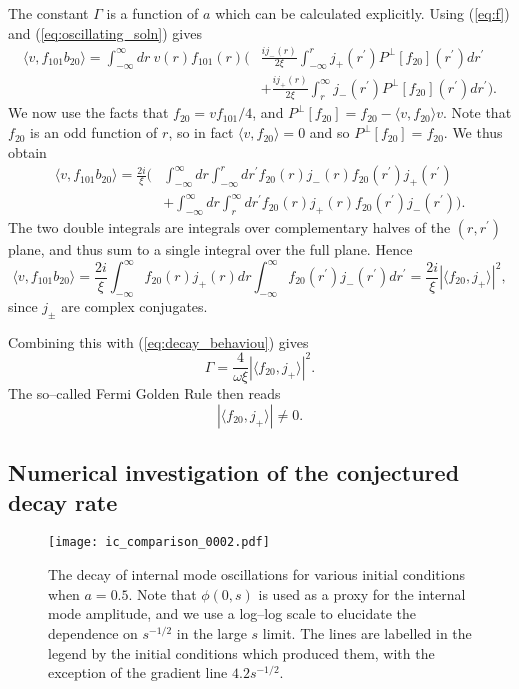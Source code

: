 The constant $\Gamma$ is a function of $a$ which can be calculated explicitly. Using (\ref{eq:f}) and (\ref{eq:oscillating_soln}) gives
\begin{align*}
\langle v, f_{101}b_{20}\rangle = \int_{-\infty}^{\infty}dr\ v(r)f_{101}(r)\bigg(&\frac{ij_-(r)}{2\xi}\int_{-\infty}^r j_+(r^\prime)P^\perp[f_{20}](r^\prime)dr^\prime \\
&+ \frac{ij_+(r)}{2\xi}\int_r^{\infty} j_-(r^\prime)P^\perp[f_{20}](r^\prime) dr^\prime\bigg).
\end{align*}
We now use the facts that $f_{20}=vf_{101}/4$, and $P^\perp[f_{20}]=f_{20}-\langle v,f_{20}\rangle v$. Note that $f_{20}$ is an odd function of $r$, so in fact $\langle v,f_{20}\rangle=0$ and so $P^\perp[f_{20}]=f_{20}$. We thus obtain
\begin{align*}
\langle v, f_{101}b_{20}\rangle = \frac{2i}{\xi}\bigg(&\int_{-\infty}^{\infty}dr
\int_{-\infty}^r dr^\prime f_{20}(r)j_-(r)f_{20}(r^\prime)j_+(r^\prime) \\
&+ \int_{-\infty}^{\infty}dr\int_r^{\infty}dr^\prime f_{20}(r)j_+(r)f_{20}(r^\prime)j_-(r^\prime)\bigg).
\end{align*}
The two double integrals are integrals over complementary halves of the $(r,r^\prime)$ plane, and thus sum to a single integral over the full plane. Hence
\[
\langle v, f_{101}b_{20}\rangle = \frac{2i}{\xi}\int_{-\infty}^{\infty}f_{20}(r)j_+(r)dr
\int_{-\infty}^\infty  f_{20}(r^\prime)j_-(r^\prime) dr^\prime=\frac{2i}{\xi}|\langle f_{20}, j_+ \rangle|^2,
\]
since $j_\pm$ are complex conjugates.

Combining this with (\ref{eq:decay_behaviou}) gives
\[
\Gamma = \frac{4}{\omega\xi}|\langle f_{20}, j_+\rangle|^2.
\]
The so--called Fermi Golden Rule then reads
\[
|\langle f_{20}, j_+\rangle|\neq 0.
\]

\subsection{Numerical investigation of the conjectured decay rate}
\label{sec:numerics}

\begin{figure}
\texttt{[image: ic\_comparison\_0002.pdf]}
\caption{\label{fig:decay} The decay of internal mode oscillations for various initial conditions when $a=0.5$. Note that $\phi(0,s)$ is used as a proxy for the internal mode amplitude, and we use a log--log scale to elucidate the dependence on $s^{-1/2}$ in the large $s$ limit. The lines are labelled in the legend by the initial conditions which produced them, with the exception of the gradient line $4.2s^{-1/2}$.}
\end{figure}

